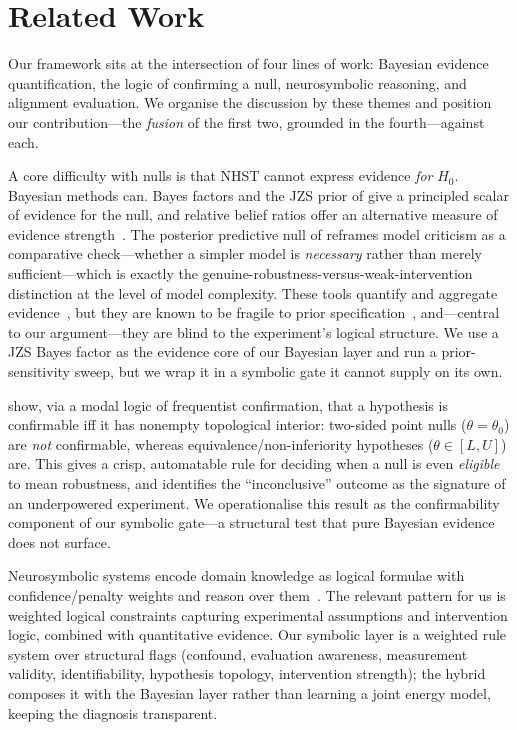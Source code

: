 \section{Related Work}
\label{sec:related}

Our framework sits at the intersection of four lines of work: Bayesian evidence
quantification, the logic of confirming a null, neurosymbolic reasoning, and
alignment evaluation. We organise the discussion by these themes and position our
contribution---the \emph{fusion} of the first two, grounded in the fourth---against
each.

 A core difficulty with nulls is that
NHST cannot express evidence \emph{for} $H_0$. Bayesian methods can. Bayes factors
and the JZS prior of \citet{rouder2009bayesian} give a principled scalar of
evidence for the null, and relative belief ratios offer an alternative measure of
evidence strength~\citep{evans2023measure}. The posterior predictive null of
\citet{moran2022ppn} reframes model criticism as a comparative check---whether a
simpler model is \emph{necessary} rather than merely sufficient---which is exactly
the genuine-robustness-versus-weak-intervention distinction at the level of model
complexity. These tools quantify and aggregate evidence~\citep{vandeschoot2025bf},
but they are known to be fragile to prior specification~\citep{robert2016demise},
and---central to our argument---they are blind to the experiment's logical
structure. We use a JZS Bayes factor as the evidence core of our Bayesian layer
and run a prior-sensitivity sweep, but we wrap it in a symbolic gate it cannot
supply on its own.

 \citet{dale2024confirming} show, via a modal
logic of frequentist confirmation, that a hypothesis is confirmable iff it has
nonempty topological interior: two-sided point nulls ($\theta = \theta_0$) are
\emph{not} confirmable, whereas equivalence/non-inferiority hypotheses
($\theta \in [L,U]$) are. This gives a crisp, automatable rule for deciding when a
null is even \emph{eligible} to mean robustness, and identifies the
``inconclusive'' outcome as the signature of an underpowered experiment. We
operationalise this result as the confirmability component of our symbolic
gate---a structural test that pure Bayesian evidence does not surface.

 Neurosymbolic systems encode domain knowledge
as logical formulae with confidence/penalty weights and reason over
them~\citep{tran2025neurosymbolic}. The relevant pattern for us is weighted
logical constraints capturing experimental assumptions and intervention logic,
combined with quantitative evidence. Our symbolic layer is a weighted rule system
over structural flags (confound, evaluation awareness, measurement validity,
identifiability, hypothesis topology, intervention strength); the hybrid composes
it with the Bayesian layer rather than learning a joint energy model, keeping the
diagnosis transparent.


